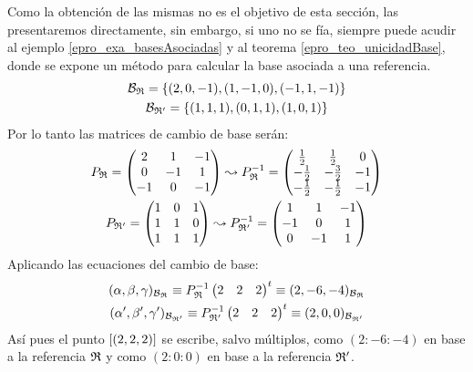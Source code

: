 \begin{exa}
	Como la obtención de las mismas no es el objetivo de esta sección, las presentaremos directamente, sin embargo, si uno no se fía, siempre puede acudir al ejemplo \ref{epro_exa_basesAsociadas} y al teorema \ref{epro_teo_unicidadBase}, donde se expone un método para calcular la base asociada a una referencia.
	\begin{gather*}
		\mathcal{B}_{\mathfrak{R}}=\{(2,0,-1),(1,-1,0),(-1,1,-1)\}\\
		\mathcal{B}_{\mathfrak{R}'}=\{(1,1,1),(0,1,1),(1,0,1)\}
	\end{gather*}
	Por lo tanto las matrices de cambio de base serán:
	\begin{gather*}
			P_{\mathfrak{R}}=\begin{pmatrix}
				2 & 1 & -1\\
				0 & -1 & 1\\
				-1 & 0 & -1
			\end{pmatrix}\leadsto P_{\mathfrak{R}}^{-1}=\begin{pmatrix}
			\frac{1}{2} & \frac{1}{2} & 0 \\
			-\frac{1}{2} & -\frac{3}{2} & -1 \\
			-\frac{1}{2} & -\frac{1}{2} & -1
		\end{pmatrix}\\
			P_{\mathfrak{R}'}=\begin{pmatrix}
				1 & 0 & 1\\
				1 & 1 & 0\\
				1 & 1 & 1
			\end{pmatrix}\leadsto P_{\mathfrak{R}'}^{-1}=\begin{pmatrix}
			1 & 1 & -1 \\
			-1 & 0 & 1 \\
			0 & -1 & 1
		\end{pmatrix}
	\end{gather*}
	Aplicando las ecuaciones del cambio de base:
	\begin{gather*}
		(\alpha,\beta,\gamma)_{\mathcal{B}_{\mathfrak{R}}}\equiv P_{\mathfrak{R}}^{-1}\begin{pmatrix}
			2 & 2 & 2
		\end{pmatrix}^t\equiv(2,-6,-4)_{\mathcal{B}_{\mathfrak{R}}}\\
		(\alpha',\beta',\gamma')_{\mathcal{B}_{\mathfrak{R}'}}\equiv P_{\mathfrak{R}'}^{-1}\begin{pmatrix}
			2 & 2 & 2
		\end{pmatrix}^t\equiv (2,0,0)_{\mathcal{B}_{\mathfrak{R}'}}
	\end{gather*}
	Así pues el punto $\left [ (2,2,2) \right ]$ se escribe, salvo múltiplos, como $(2:-6:-4)$ en base a la referencia $\mathfrak{R}$ y como $(2:0:0)$ en base a la referencia $\mathfrak{R}'$.
	

\end{exa}
